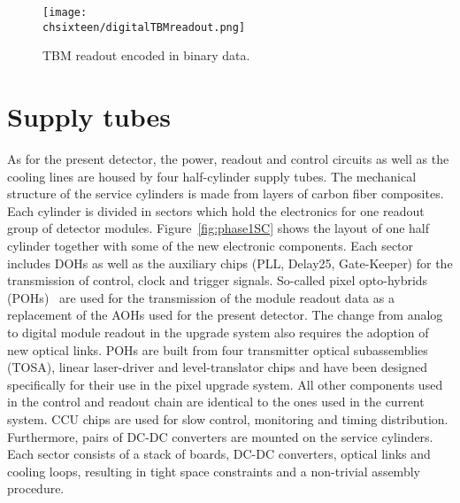 \begin{figure}[!htb]
 \begin{center}
 \texttt{[image: \\chsixteen/digitalTBMreadout.png]}
 \end{center}
 \caption{TBM readout encoded in binary data.}
 \label{fig:digTBMRO}
\end{figure}


\section{Supply tubes}

As for the present detector, the power, readout and control circuits as well as the cooling lines are housed by four half-cylinder supply tubes.
The mechanical structure of the service cylinders is made from layers of carbon fiber composites.
Each cylinder is divided in sectors which hold the electronics for one readout group of detector modules.
Figure~\ref{fig:phase1SC} shows the layout of one half cylinder together with some of the new electronic components.
Each sector includes DOHs as well as the auxiliary chips (PLL, Delay25, Gate-Keeper) for the transmission of control, clock and trigger signals.
So-called pixel opto-hybrids (POHs)~\cite{1748-0221-7-01-C01113} are used for the transmission of the module readout data as a replacement of the AOHs used for the present detector.
The change from analog to digital module readout in the upgrade system also requires the adoption of new optical links.
POHs are built from four transmitter optical subassemblies (TOSA), linear laser-driver and level-translator chips and have been designed specifically for their use in the pixel upgrade system.
All other components used in the control and readout chain are identical to the ones used in the current system. CCU chips are used for slow control, monitoring and timing distribution.
Furthermore, pairs of DC-DC converters are mounted on the service cylinders.
Each sector consists of a stack of boards, DC-DC converters, optical links and cooling loops, resulting in tight space constraints and a non-trivial assembly procedure.

